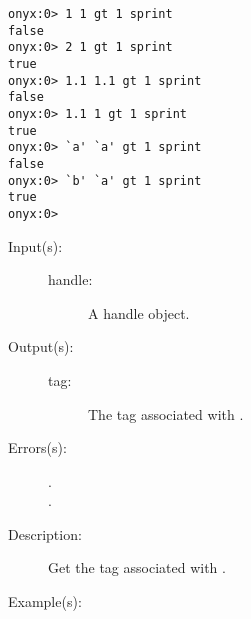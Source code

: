 \begin{description}
\begin{description}
\begin{verbatim}
onyx:0> 1 1 gt 1 sprint
false
onyx:0> 2 1 gt 1 sprint
true
onyx:0> 1.1 1.1 gt 1 sprint
false
onyx:0> 1.1 1 gt 1 sprint
true
onyx:0> `a' `a' gt 1 sprint
false
onyx:0> `b' `a' gt 1 sprint
true
onyx:0>
		\end{verbatim}
	\end{description}
\label{systemdict:handletag}
\item[{\onyxop{handle}{handletag}{tag}}: ]
	\begin{description}\item[]
	\item[Input(s): ]
		\begin{description}\item[]
		\item[handle: ]
			A handle object.
		\end{description}
	\item[Output(s): ]
		\begin{description}\item[]
		\item[tag: ]
			The tag associated with .
		\end{description}
	\item[Errors(s): ]
		\begin{description}\item[]
		\item[.]
		\item[.]
		\end{description}
	\item[Description: ]
		Get the tag associated with .
	\item[Example(s): ]\begin{verbatim}


\end{verbatim}
\end{description}
\end{description}
